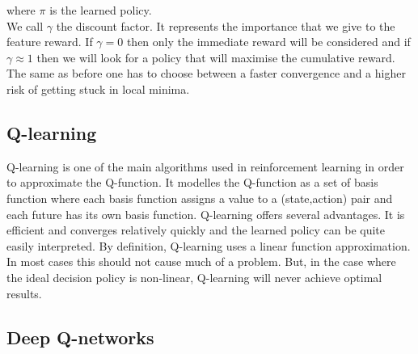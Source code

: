 where $\pi$ is the learned policy.\\
We call $\gamma$ the discount factor. It represents the importance that we give to the feature reward. If $\gamma = 0$ then only the immediate reward will be considered and if $\gamma \approx 1$ then we will look for a policy that will maximise the cumulative reward. The same as before one has to choose between a faster convergence and a higher risk of getting stuck in local minima.

 
\subsection{Q-learning}
Q-learning\cite{watkins1992q} is one of the main algorithms used in reinforcement learning in order to approximate the Q-function. It modelles the Q-function as a set of basis function where each basis function assigns a value to a (state,action) pair and each future has its own basis function. Q-learning offers several advantages. It is efficient and converges relatively quickly and the learned policy can be quite easily interpreted. By definition, Q-learning uses a linear function approximation. In most cases this should not cause much of a problem. But, in the case where the ideal decision policy is non-linear, Q-learning will never achieve optimal results.
\subsection{Deep Q-networks}

